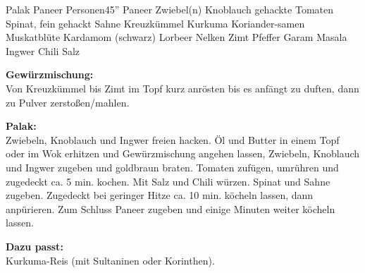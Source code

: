 \begin{MyRecipe}{Palak Paneer}{ Personen}{45''}
	 {Paneer}
	 {Zwiebel(n)}
	 {Knoblauch}
	 {gehackte Tomaten}
	 {Spinat, fein gehackt}
	 {Sahne}
	 {Kreuzkümmel}
	 {Kurkuma}
	 {Koriander-samen}
	 {Muskatblüte}
	 {Kardamom (schwarz)}
	\ingredient[\Calc{1}{\x}]{} {Lorbeer}
	 {Nelken}
	 {Zimt}
	 {Pfeffer}
	 {Garam Masala}
	 {Ingwer}
	\ingredient[]{} {Chili}
	\ingredient[]{} {Salz}
	
	
		
	\textbf{Gewürzmischung:}\\
	Von Kreuzkümmel bis Zimt im Topf kurz anrösten bis es anfängt zu duften, dann zu Pulver zerstoßen/mahlen.\\\par\bigskip
	
	\textbf{Palak:}\\
	Zwiebeln, Knoblauch und Ingwer freien hacken. Öl und Butter in einem Topf oder im Wok erhitzen und Gewürzmischung angehen lassen, Zwiebeln, Knoblauch und Ingwer zugeben und goldbraun braten. Tomaten zufügen, umrühren und zugedeckt ca. 5 min. kochen. Mit Salz und Chili würzen. Spinat und Sahne zugeben. Zugedeckt bei geringer Hitze ca. 10 min. köcheln lassen, dann anpürieren. Zum Schluss Paneer zugeben und einige Minuten weiter köcheln lassen.\\\par\bigskip
	
	\textbf{Dazu passt:}\\
	Kurkuma-Reis (mit Sultaninen oder Korinthen).

	
	
				
	\end{MyRecipe}